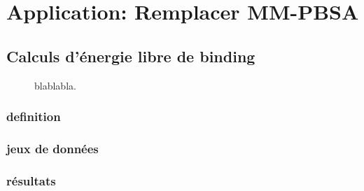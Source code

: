 \chapter{Application: Remplacer MM-PBSA}



\section{Calculs d'énergie libre de binding}

\begin{figure}
  \center
    \caption{blablabla.}
    \label{fig:Energie libre de binding}
\end{figure}


\subsection{definition}
\subsection{jeux de données}
\subsection{résultats}

